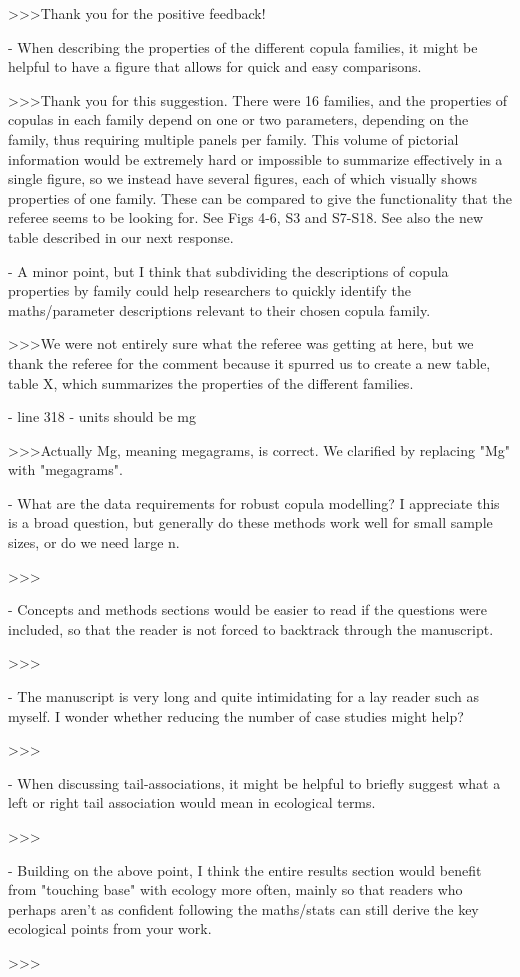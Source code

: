 >>>Thank you for the positive feedback!

- When describing the properties of the different copula families, it might be helpful to have a 
figure that allows for quick and easy comparisons.

>>>Thank you for this suggestion. There were 16 families, and the properties 
of copulas in each family depend on one or two parameters, depending on the 
family, thus requiring multiple panels per family. This volume of pictorial 
information would be extremely hard or impossible to summarize effectively in a 
single figure, so we instead have several figures, each of which visually 
shows properties of one family. These can be compared to give the functionality that 
the referee seems to be looking for. See Figs 4-6, S3 and S7-S18. See also the new
table described in our next response.

- A minor point, but I think that subdividing the descriptions of copula properties by family could 
help researchers to quickly identify the maths/parameter descriptions relevant to their chosen copula 
family.

>>>We were not entirely sure what the referee was getting at here, but we
thank the referee for the comment because it spurred us to create a new table, 
table X, which summarizes the properties of the different families.

- line 318 - units should be mg

>>>Actually Mg, meaning megagrams, is correct. We clarified by replacing "Mg" with "megagrams".

- What are the data requirements for robust copula modelling? I appreciate this is a broad question, but generally do these methods work well for small sample sizes, or do we need large n.

>>>

- Concepts and methods sections would be easier to read if the questions were included, so that the reader is not forced to backtrack through the manuscript.

>>>

- The manuscript is very long and quite intimidating for a lay reader such as myself. I wonder whether reducing the number of case studies might help?

>>>

- When discussing tail-associations, it might be helpful to briefly suggest what a left or right tail association would mean in ecological terms.

>>>

- Building on the above point, I think the entire results section would benefit from "touching base" with ecology more often, mainly so that readers who perhaps aren't as confident following the maths/stats can still derive the key ecological points from your work.

>>>

